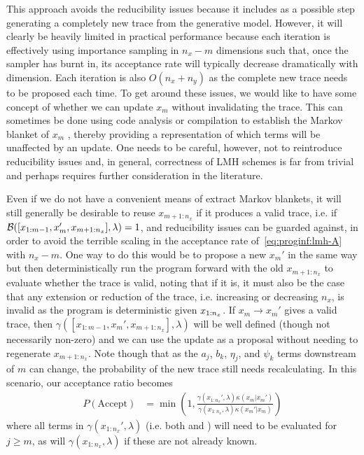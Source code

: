 This approach avoids the reducibility issues because it
includes as a possible step generating a completely new trace from the generative model.  However,
it will clearly be heavily limited in practical performance because each iteration
is effectively using importance sampling in $n_x-m$ dimensions such that, once the sampler has burnt in,
its acceptance rate will typically decrease dramatically with dimension.  Each iteration is also $O(n_x+n_y)$ as
the complete new trace needs to be proposed each time.  To get around these issues, we would like
to have some concept of whether we can update $x_m$ without invalidating the trace.  This can sometimes
be done using code analysis or compilation to establish the Markov blanket of $x_m$
\citep{yang2014generating,mansinghka2014venture,ritchie2016c3}, thereby providing a representation of which
terms will be unaffected by an update.  One needs to be
careful, however, not to reintroduce reducibility issues and, in general, correctness of LMH schemes is
far from trivial and perhaps requires further consideration in the literature.

Even if we do not have a convenient means of extract Markov blankets, it will still generally be desirable
to reuse $x_{m+1:n_x}$ if it produces a valid trace, i.e. if $\mathcal{B} ([x_{1:m-1},x_m',x_{m+1:n_x}],\lambda)=1$, and reducibility
issues can be guarded against, in order to avoid the terrible scaling in the acceptance rate 
of~\ref{eq:proginf:lmh-A}  with $n_x-m$.  One way to do this would be to propose
a new $x_m'$ in the same way but then deterministically run the program forward with the old
$x_{m+1:n_x}$ to evaluate whether the trace is valid, noting that if it is, it must also be the case that any 
extension or reduction of the trace, i.e. increasing or decreasing
$n_x$, is invalid as the program is deterministic given $x_{1:n_x}$.  If $x_m \rightarrow x_m'$ gives
a valid trace, then $\gamma([x_{1:m-1},x_m',x_{m+1:n_x}],\lambda)$ will be well defined (though not necessarily
non-zero) and we can use the update as a proposal without needing to regenerate $x_{m+1:n_x}$.  Note though
that as the $a_j$, $b_k$, $\eta_j$, and $\psi_k$ terms downstream of $m$ can change, the 
probability of the new trace still needs recalculating.  In this scenario, our acceptance ratio becomes
\begin{align}
  P(\text{Accept}) &= \min\left(1, \frac{\gamma(x_{1:n_x}',\lambda) \kappa(x_m | x_{m}')  }
  {\gamma(x_{1:n_x},\lambda) \kappa(x_m' | x_{m})  }\right)
\end{align}
where all terms in $\gamma(x_{1:n_x}',\lambda)$ (i.e. both \sample and \observe) will need
to be evaluated for $j\ge m$, as will $\gamma(x_{1:n_x},\lambda)$ if these are not already known. 

